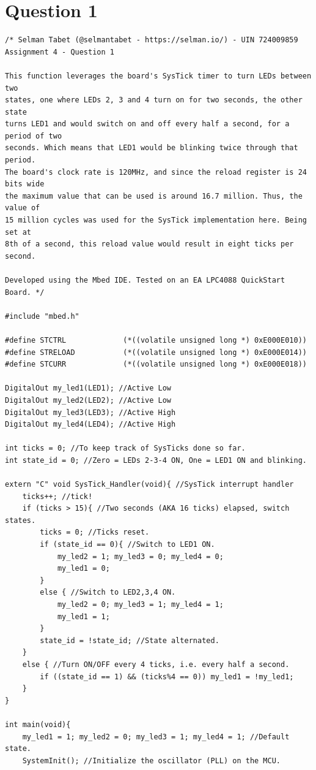 \documentclass{article}
\begin{document}
\section*{Question 1}
\begin{verbatim}
/* Selman Tabet (@selmantabet - https://selman.io/) - UIN 724009859
Assignment 4 - Question 1

This function leverages the board's SysTick timer to turn LEDs between two
states, one where LEDs 2, 3 and 4 turn on for two seconds, the other state 
turns LED1 and would switch on and off every half a second, for a period of two
seconds. Which means that LED1 would be blinking twice through that period.
The board's clock rate is 120MHz, and since the reload register is 24 bits wide
the maximum value that can be used is around 16.7 million. Thus, the value of
15 million cycles was used for the SysTick implementation here. Being set at 
8th of a second, this reload value would result in eight ticks per second.

Developed using the Mbed IDE. Tested on an EA LPC4088 QuickStart Board. */

#include "mbed.h"

#define STCTRL             (*((volatile unsigned long *) 0xE000E010))
#define STRELOAD           (*((volatile unsigned long *) 0xE000E014))
#define STCURR             (*((volatile unsigned long *) 0xE000E018))

DigitalOut my_led1(LED1); //Active Low
DigitalOut my_led2(LED2); //Active Low
DigitalOut my_led3(LED3); //Active High
DigitalOut my_led4(LED4); //Active High

int ticks = 0; //To keep track of SysTicks done so far.
int state_id = 0; //Zero = LEDs 2-3-4 ON, One = LED1 ON and blinking. 

extern "C" void SysTick_Handler(void){ //SysTick interrupt handler
    ticks++; //tick!
    if (ticks > 15){ //Two seconds (AKA 16 ticks) elapsed, switch states.
        ticks = 0; //Ticks reset.
        if (state_id == 0){ //Switch to LED1 ON.
            my_led2 = 1; my_led3 = 0; my_led4 = 0;
            my_led1 = 0;
        }
        else { //Switch to LED2,3,4 ON.
            my_led2 = 0; my_led3 = 1; my_led4 = 1;
            my_led1 = 1;
        }
        state_id = !state_id; //State alternated.
    }
    else { //Turn ON/OFF every 4 ticks, i.e. every half a second.
        if ((state_id == 1) && (ticks%4 == 0)) my_led1 = !my_led1;
    }
}

int main(void){
    my_led1 = 1; my_led2 = 0; my_led3 = 1; my_led4 = 1; //Default state.
    SystemInit(); //Initialize the oscillator (PLL) on the MCU.
    

\end{verbatim}
\end{document}
